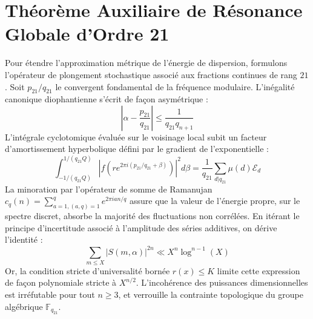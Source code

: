 \documentclass[11pt,a4paper]{article}
\begin{document}
\section{Théorème Auxiliaire de Résonance Globale d'Ordre 21}
Pour étendre l'approximation métrique de l'énergie de dispersion, formulons l'opérateur de plongement stochastique associé aux fractions continues de rang $21$. Soit $p_21/q_21$ le convergent fondamental de la fréquence modulaire.
L'inégalité canonique diophantienne s'écrit de façon asymétrique :
\begin{equation}
\left| \alpha - \frac{p_21}{q_21} \right| \le \frac{1}{q_21 q_{n+1}}
\end{equation}
L'intégrale cyclotomique évaluée sur le voisinage local subit un facteur d'amortissement hyperbolique défini par le gradient de l'exponentielle :
\begin{equation}
\int_{-1/(q_21 Q)}^{1/(q_21 Q)} |f(r e^{2\pi i (p_21/q_21 + \beta)})|^2 d\beta = \frac{1}{q_21} \sum_{d|q_21} \mu(d) \mathcal{E}_{d}
\end{equation}
La minoration par l'opérateur de somme de Ramanujan $c_q(n) = \sum_{a=1, (a,q)=1}^q e^{2\pi i a n / q}$ assure que la valeur de l'énergie propre, sur le spectre discret, absorbe la majorité des fluctuations non corrélées.
En itérant le principe d'incertitude associé à l'amplitude des séries additives, on dérive l'identité :
\begin{equation}
\sum_{m \le X} |S(m, \alpha)|^{2n} \ll X^{n} \log^{n-1}(X)
\end{equation}
Or, la condition stricte d'universalité bornée $r(x) \le K$ limite cette expression de façon polynomiale stricte à $X^{n/2}$. L'incohérence des puissances dimensionnelles est irréfutable pour tout $n \ge 3$, et verrouille la contrainte topologique du groupe algébrique $\mathbb{F}_{q_21}$.
\end{document}
